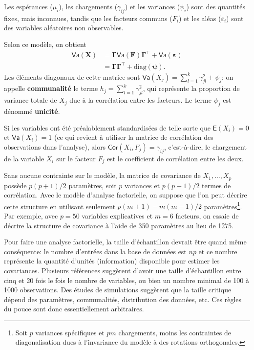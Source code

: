 \documentclass[
  11pt,
  letterpaper,
]{book}
\theoremstyle{definition}
\theoremstyle{remark}
\begin{document}
Les espérances (\(\mu_i\)), les chargements (\(\gamma_{ij}\)) et les
variances (\(\psi_i\)) sont des quantités fixes, mais inconnues, tandis
que les facteurs communs (\(F_i\)) et les aléas (\(\varepsilon_i\)) sont
des variables aléatoires non observables.

Selon ce modèle, on obtient \begin{align*}
\mathsf{Va}(\boldsymbol{X}) &= \boldsymbol{\Gamma}\mathsf{Va}(\boldsymbol{F})\boldsymbol{\Gamma}^\top + \mathsf{Va}(\boldsymbol{\varepsilon})\\
& = \boldsymbol{\Gamma}\boldsymbol{\Gamma}^\top + \mathrm{diag}(\boldsymbol{\psi}).
\end{align*} Les éléments diagonaux de cette matrice sont
\(\mathsf{Va}(X_j) = \sum_{l=1}^k \gamma_{jl}^2 + \psi_j\): on appelle
\textbf{communalité} le terme \(h_j = \sum_{l=1}^k \gamma_{jl}^2\), qui
représente la proportion de variance totale de \(X_j\) due à la
corrélation entre les facteurs. Le terme \(\psi_j\) est dénommé
\textbf{unicité}.

Si les variables ont été préalablement standardisées de telle sorte que
\(\mathsf{E}(X_i)=0\) et \(\mathsf{Va}(X_i)=1\) (ce qui revient à
utiliser la matrice de corrélation des observations dans l'analyse),
alors \(\mathsf{Cor}(X_i, F_j)=\gamma_{ij}\), c'est-à-dire, le
chargement de la variable \(X_i\) sur le facteur \(F_j\) est le
coefficient de corrélation entre les deux.

Sans aucune contrainte sur le modèle, la matrice de covariance de
\(X_1, \ldots, X_p\) possède \(p(p+1)/2\) paramètres, soit \(p\)
variances et \(p(p-1)/2\) termes de corrélation. Avec le modèle
d'analyse factorielle, on suppose que l'on peut décrire cette structure
en utilisant seulement \(p(m+1) - m(m-1)/2\) paramètres\footnote{Soit
  \(p\) variances spécifiques et \(pm\) chargements, moins les
  contraintes de diagonalisation dues à l'invariance du modèle à des
  rotations orthogonales.}. Par exemple, avec \(p=50\) variables
explicatives et \(m=6\) facteurs, on essaie de décrire la structure de
covariance à l'aide de 350 paramètres au lieu de 1275.

Pour faire une analyse factorielle, la taille d'échantillon devrait être
quand même conséquente: le nombre d'entrées dans la base de données est
\(np\) et ce nombre représente la quantité d'unités (information)
disponible pour estimer les covariances. Plusieurs références suggèrent
d'avoir une taille d'échantillon entre cinq et 20 fois le fois le nombre
de variables, ou bien un nombre minimal de 100 à 1000 observations. Des
études de simulations suggèrent que la taille critique dépend des
paramètres, communalités, distribution des données, etc. Ces règles du
pouce sont donc essentiellement arbitraires.
\end{document}
